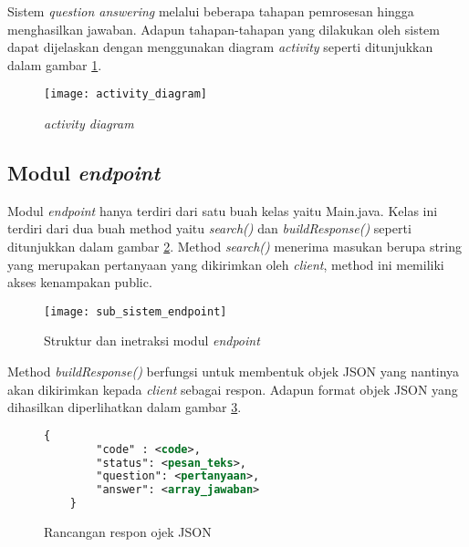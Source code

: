 Sistem \emph{question answering} melalui beberapa tahapan pemrosesan hingga menghasilkan jawaban. Adapun tahapan-tahapan yang dilakukan oleh sistem dapat dijelaskan dengan menggunakan diagram \emph{activity} seperti ditunjukkan dalam gambar \ref{fig:activity_diagram}.

\begin{figure}[hb]
    \centering
    \texttt{[image: activity\_diagram]}
    \caption{\emph{activity diagram}}
    \label{fig:activity_diagram}
\end{figure}


\subsection{Modul \emph{endpoint}}
Modul \emph{endpoint} hanya terdiri dari satu buah kelas yaitu Main.java. Kelas ini terdiri dari dua buah method yaitu \emph{search()} dan \emph{buildResponse()} seperti ditunjukkan dalam gambar \ref{fig:sub_sistem_endpoint}. Method \emph{search()} menerima masukan berupa string yang merupakan pertanyaan yang dikirimkan oleh \emph{client}, method ini memiliki akses kenampakan public.

\begin{figure}[hb]
    \centering
    \texttt{[image: sub\_sistem\_endpoint]}
    \caption{Struktur dan inetraksi modul \emph{endpoint}} 
    \label{fig:sub_sistem_endpoint}
\end{figure}

Method \emph{buildResponse()} berfungsi untuk membentuk objek JSON yang nantinya akan dikirimkan kepada \emph{client} sebagai respon. Adapun format objek JSON yang dihasilkan diperlihatkan dalam gambar \ref{fig:json_response_object}.

\begin{figure}[hb]
    \centering
    \begin{lstlisting}[language=XML,xleftmargin=0pt]
    {
        "code" : <code>,
        "status": <pesan_teks>,
        "question": <pertanyaan>,
        "answer": <array_jawaban>
    }
\end{lstlisting}
    \caption{Rancangan respon ojek JSON}
    \label{fig:json_response_object}
\end{figure}

